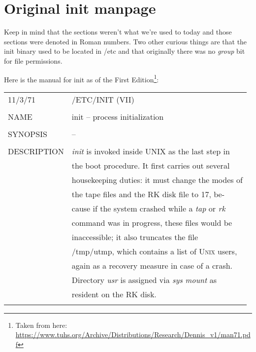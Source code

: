 \documentclass{article}
\newenvironment{manpage}{\ttfamily}{\par}
\begin{document}
\appendix

\section{Original init manpage}\label{appendix:init-man}
Keep in mind that the sections weren't what we're used
to today and those sections were denoted in Roman numbers. Two other curious things are that the init
binary used to be located in /etc and that originally there was no \textit{group} bit for file
permissions.

Here is the manual for init as of the First Edition\footnote{Taken from here: \url{https://www.tuhs.org/Archive/Distributions/Research/Dennis_v1/man71.pdf}}:

\begin{manpage}
	
	\begin{longtable}{ll}
		11/3/71 & \hspace{17em}/ETC/INIT (VII)\\\\
		
		NAME & init -- process initialization\\\\
		
		SYNOPSIS & --\\\\
		
		DESCRIPTION & \textit{init} is invoked inside UNIX as the last step in\\
		& the boot procedure. It first carries out several\\
		& housekeeping duties: it must change the modes of\\
		& the tape files and the RK disk file to 17, be-\\
		& cause if the system crashed while a \textit{tap} or \textit{rk}\\
		& command was in progress, these files would be\\
		& inaccessible; it also truncates the file\\
		& /tmp/utmp, which contains a list of U\textsc{nix} users,\\
		& again as a recovery measure in case of a crash.\\
		& Directory \textit{usr} is assigned via \textit{sys} \textit{mount} as\\
		& resident on the RK disk.\\\\
		

\end{longtable}
\end{manpage}
\end{document}
